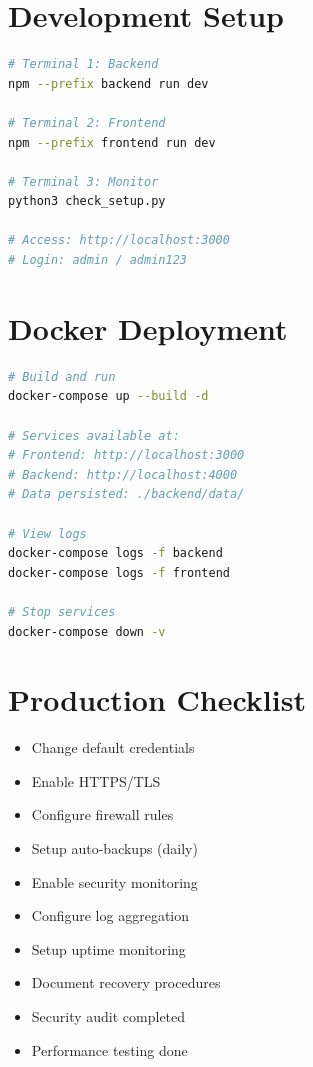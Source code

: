 \documentclass[12pt,a4paper]{report}
\begin{document}
\section{Development Setup}

\begin{lstlisting}[language=bash]
# Terminal 1: Backend
npm --prefix backend run dev

# Terminal 2: Frontend  
npm --prefix frontend run dev

# Terminal 3: Monitor
python3 check_setup.py

# Access: http://localhost:3000
# Login: admin / admin123
\end{lstlisting}

\section{Docker Deployment}

\begin{lstlisting}[language=bash]
# Build and run
docker-compose up --build -d

# Services available at:
# Frontend: http://localhost:3000
# Backend: http://localhost:4000
# Data persisted: ./backend/data/

# View logs
docker-compose logs -f backend
docker-compose logs -f frontend

# Stop services
docker-compose down -v
\end{lstlisting}

\section{Production Checklist}

\begin{itemize}
    \item Change default credentials
    \item Enable HTTPS/TLS
    \item Configure firewall rules
    \item Setup auto-backups (daily)
    \item Enable security monitoring
    \item Configure log aggregation
    \item Setup uptime monitoring
    \item Document recovery procedures
    \item Security audit completed
    \item Performance testing done
\end{itemize}
\end{document}

